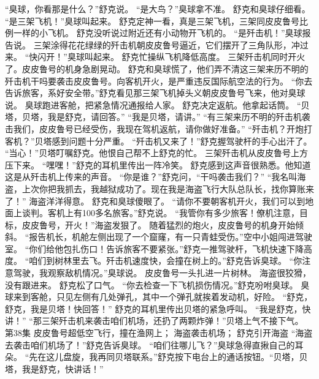 \documentclass[a4paper,12pt,UTF8,twoside]{ctexbook}
\begin{document}
        “臭球，你看那是什么？”舒克说。 
        “是大鸟？”臭球拿不准。 
        舒克和臭球仔细看。 
        “是三架飞机！”臭球叫起来。 
        舒克定神一看，真是三架飞机，三架同皮皮鲁号比例一样的小飞机。 
        舒克没听说过附近还有小动物开飞机的。 
        “是歼击机！”臭球报告说。 
        三架涂得花花绿绿的歼击机朝皮皮鲁号逼近，它们摆开了三角队形，冲过来。 
        “快闪开！”臭球叫起来。 
        舒克忙操纵飞机降低高度。 
        三架歼击机同时开火了。皮皮鲁号的机身急剧晃动。 
        舒克和臭球慌了，他们弄不清这三架来历不明的歼击机干吗要袭击皮皮鲁号。向客机开火，是严重违反国际航空法的行为。 
        “你去告诉旅客，系好安全带。”舒克看见那三架飞机掉头义朝皮皮鲁号飞来，他对臭球说。 
        臭球跑进客舱，把紧急情况通报给人家。 
        舒克决定返航。他拿起话筒。 
        “贝塔，贝塔，我是舒克，请回答。” 
        “我是贝塔，请讲。” 
        “有三架来历不明的歼击机袭击我们，皮皮鲁号已经受伤，我现在驾机返航，请你做好准备。” 
        “歼击机？开炮打客机？”贝塔感到问题十分严重。 
        “歼击机又来了！”舒克握驾驶杆的手心出汗了。 
        “当心！”贝塔叮嘱舒克。他恨自己帮不上舒克的忙。 
        三架歼击机从皮皮鲁号上方压下来。 
        “嘿嘿！”舒克的耳机里传出一阵冷笑。 
        舒克感到这声音很熟悉。他知道这是从歼击机上传来的声音。 
        “你是谁？”舒克问，“干吗袭击我们？” 
        “我名叫海盗，上次你把我抓去，我越狱成功了。现在我是海盗飞行大队总队长，找你算账来了！” 
        海盗洋洋得意。 
        舒克和臭球傻眼了。 
        “请你不要朝客机开火，我们可以到地面上谈判。客机上有100多名旅客。”舒克说。 
        “我管你有多少旅客！僚机注意，目标，皮皮鲁号，开火！”海盗发狠了。 
          随着猛烈的炮火，皮皮鲁号的机身开始倾斜。 
        “报告机长，机舱左侧出现了一个窟窿，有一只青蛙受伤。”空中小姐闯进驾驶室。 
        “你们给他包扎伤口！告诉旅客不要紧张。”舒克一推驾驶杆，飞机快速下降高度。 
        “咱们到树林里去飞。歼击机速度快，会撞在树上的。”舒克告诉臭球。 
        “你注意驾驶，我观察敌机情况。”臭球说。 
        皮皮鲁号一头扎进一片树林。 
        海盗很狡猾，没有跟进来。 
        舒克松了口气。 
        “你去检查一下飞机损伤情况。”舒克吩咐臭球。 
        臭球来到客舱，只见左侧有几处弹孔，其中一个弹孔就挨着发动机，好险。 
        “舒克，舒克，我是贝塔！快回答！” 
        舒克的耳机里传出贝塔的紧急呼叫。 
        “我是舒克，快讲！” 
        “那三架歼击机来袭击咱们机场，还扔了两颗炸弹！”贝塔上气不接下气。   第38集 
        皮皮鲁号超低空飞行，撞在渔网上； 
        海盗袭击机场； 
        舒克引开海盗   
        “海盗去袭击咱们机场了！”舒克告诉臭球。 
        “咱们往哪儿飞？”臭球急得直揪自己的耳朵。 
        “先在这儿盘旋，我再同贝塔联系。”舒克按下电台上的通话按钮。“贝塔，贝塔，我是舒克，快讲话！” 
\end{document}
